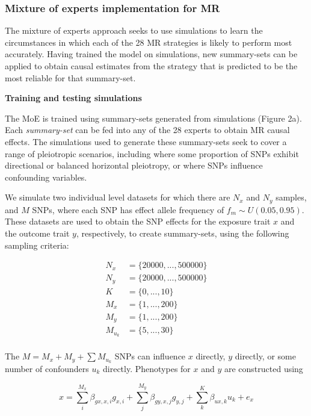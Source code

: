 \documentclass[]{article}
\begin{document}
\subsubsection{Mixture of experts implementation for
MR}\label{mixture-of-experts-implementation-for-mr}

The mixture of experts approach seeks to use simulations to learn the
circumstances in which each of the 28 MR strategies is likely to perform
most accurately. Having trained the model on simulations, new
summary-sets can be applied to obtain causal estimates from the strategy
that is predicted to be the most reliable for that summary-set.

\textbf{Training and testing simulations}

The MoE is trained using summary-sets generated from simulations (Figure
2a). Each \emph{summary-set} can be fed into any of the 28 experts to
obtain MR causal effects. The simulations used to generate these
summary-sets seek to cover a range of pleiotropic scenarios, including
where some proportion of SNPs exhibit directional or balanced horizontal
pleiotropy, or where SNPs influence confounding variables.

We simulate two individual level datasets for which there are \(N_x\)
and \(N_y\) samples, and \(M\) SNPs, where each SNP has effect allele
frequency of \(f_m \sim U(0.05, 0.95)\). These datasets are used to
obtain the SNP effects for the exposure trait \(x\) and the outcome
trait \(y\), respectively, to create summary-sets, using the following
sampling criteria:

\[
\begin{aligned}
N_x & = \{20000, ..., 500000\} \\
N_y & = \{20000, ..., 500000\} \\
K & = \{0, ..., 10\} \\
M_x & = \{1, ..., 200\} \\
M_y & = \{1, ..., 200\} \\
M_{u_k} & = \{5,..., 30\} \\
\end{aligned}
\]

The \(M = M_x + M_y + \sum{M_{u_k}}\) SNPs can influence \(x\) directly,
\(y\) directly, or some number of confounders \(u_{k}\) directly.
Phenotypes for \(x\) and \(y\) are constructed using

\[
x = \sum^{M_x}_{i}{\beta_{gx,x,i}g_{x,i}} + \sum^{M_y}_{j}{\beta_{gy,x,j}g_{y,j}} + \sum^{K}_{k}{\beta_{ux,k} u_{k}} + e_{x}
\]
\end{document}

